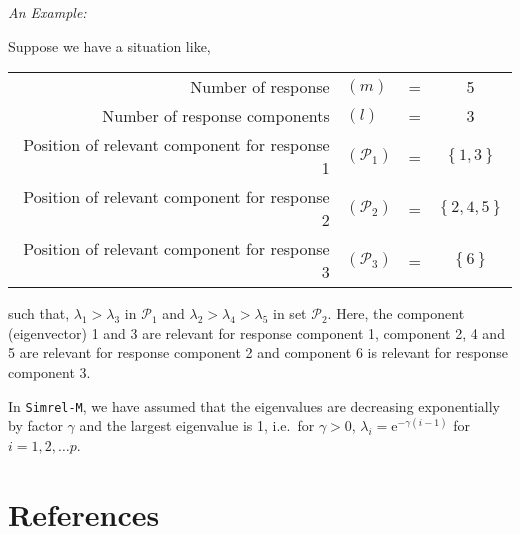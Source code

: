 \documentclass[12pt,A4paper,authoryear]{elsarticle} %
\begin{document}
\emph{An Example:}

Suppose we have a situation like,

\begin{longtable}[]{@{}rlcc@{}}
\toprule
Number of response & \((m)\) & = & 5\tabularnewline
Number of response components & \((l)\) & = & 3\tabularnewline
Position of relevant component for response 1 & \((\mathcal{P}_1)\) & =
& \(\left\{ 1, 3 \right\}\)\tabularnewline
Position of relevant component for response 2 & \((\mathcal{P}_2)\) & =
& \(\left\{ 2, 4, 5 \right\}\)\tabularnewline
Position of relevant component for response 3 & \((\mathcal{P}_3)\) & =
& \(\left\{ 6 \right\}\)\tabularnewline
\bottomrule
\end{longtable}

such that, \(\lambda_1 > \lambda_3\) in \(\mathcal{P}_1\) and
\(\lambda_2 > \lambda_4 > \lambda_5\) in set \(\mathcal{P}_2\). Here,
the component (eigenvector) 1 and 3 are relevant for response component
1, component 2, 4 and 5 are relevant for response component 2 and
component 6 is relevant for response component 3.

In \texttt{Simrel-M}, we have assumed that the eigenvalues are
decreasing exponentially by factor \(\gamma\) and the largest eigenvalue
is 1, i.e.~for \(\gamma > 0\), \(\lambda_i = \text{e}^{-\gamma(i-1)}\)
for \(i = 1, 2, \ldots p\).

\section*{References}\label{references}


\renewcommand\refname{References}

\end{document}
